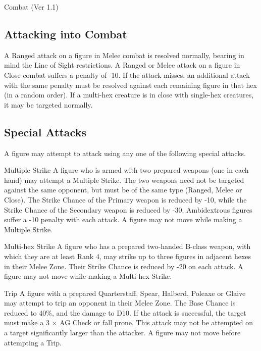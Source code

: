 \begin{Chapter}{Combat (Ver 1.1)}
\subsection{Attacking into Combat}

A Ranged attack on a figure in Melee combat is resolved normally,
bearing in mind the Line of Sight restrictions.  A Ranged or Melee
attack on a figure in Close combat suffers a penalty of -10.  If the
attack misses, an additional attack with the same penalty must be
resolved against each remaining figure in that hex (in a random
order). If a multi-hex creature is in close with single-hex creatures,
it may be targeted normally.

\subsection{Special Attacks}

A figure may attempt to attack using any one of the following special
attacks.

\begin{Description}
  
\item[Multiple Strike] A figure who is armed with two prepared weapons
  (one in each hand) may attempt a Multiple Strike.  The two weapons
  need not be targeted against the same opponent, but must be of the
  same type (Ranged, Melee or Close).  The Strike Chance of the
  Primary weapon is reduced by -10, while the Strike Chance of the
  Secondary weapon is reduced by -30.  Ambidextrous figures suffer a
  -10 penalty with each attack. A figure may not move while making a
  Multiple Strike.

\item[Multi-hex Strike] A figure who has a prepared two-handed B-class
  weapon, with which they are at least Rank 4, may strike up to three
  figures in adjacent hexes in their Melee Zone.  Their Strike Chance
  is reduced by -20 on each attack. A figure may not move while making
  a Multi-hex Strike.

\item[Trip] A figure with a prepared Quarterstaff, Spear, Halberd,
  Poleaxe or Glaive may attempt to trip an opponent in their Melee
  Zone. The Base Chance is reduced to 40\%, and the damage to D10.  If
  the attack is successful, the target must make a 3 × AG Check or
  fall prone.  This attack may not be attempted on a target
  significantly larger than the attacker. A figure may not move before
  attempting a Trip.


\end{Description}
\end{Chapter}
